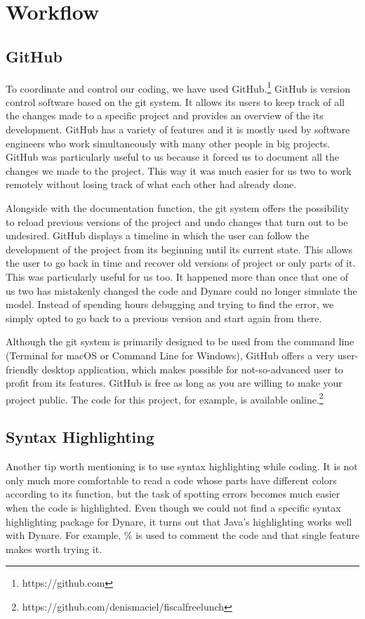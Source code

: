\section{Workflow}

\subsection*{GitHub}
\label{sub:GitHub}

To coordinate and control our coding, we have used GitHub.\footnote{https://github.com} GitHub is version control software based on the git system. It allows its users to keep track of all the changes made to a specific project and provides an overview of the its development. GitHub has a variety of features and it is mostly used by software engineers who work simultaneously with many other people in big projects. GitHub was particularly useful to us because it forced us to document all the changes we made to the project. This way it was much easier for us two to work remotely without losing track of what each other had already done.
\par
\bigskip
Alongside with the documentation function, the git system offers the possibility to reload previous versions of the project and undo changes that turn out to be undesired. GitHub displays a timeline in which the user can follow the development of the project from its beginning until its current state. This allows the user to go back in time and recover old versions of project or only parts of it. This was particularly useful for us too. It happened more than once that one of us two has mistakenly changed the code and Dynare could no longer simulate the model. Instead of spending hours debugging and trying to find the error, we simply opted to go back to a previous version and start again from there.
\par
\bigskip
Although the git system is primarily designed to be used from the command line (Terminal for macOS or Command Line for Windows), GitHub offers a very user-friendly desktop application, which makes possible for not-so-advanced user to profit from its features. GitHub is free as long as you are willing to make your project public. The code for this project, for example, is available online.\footnote{https://github.com/denismaciel/fiscalfreelunch}


\subsection*{Syntax Highlighting}
\label{sub:Syntax Highlighting}

Another tip worth mentioning is to use syntax highlighting while coding. It is not only much more comfortable to read a code whose parts have different colors according to its function, but the task of spotting errors becomes much easier when the code is highlighted. Even though we could not find a specific syntax highlighting package for Dynare, it turns out that Java's highlighting works well with Dynare. For example, \% is used to comment the code and that single feature makes worth trying it.
